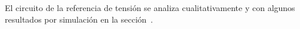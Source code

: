 
\vspace{1.5cm}



El circuito de la referencia de tensión se analiza cualitativamente y con algunos resultados por simulación en la sección~.\\


\clearpage